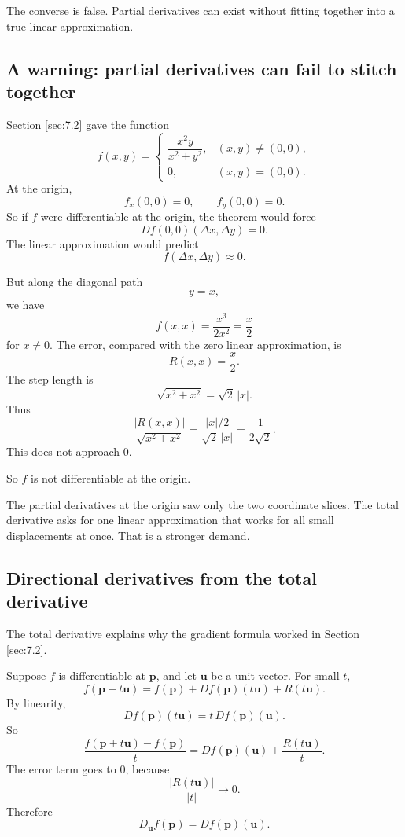 The converse is false.  Partial derivatives can exist without fitting together into a true
linear approximation.

\subsection{A warning: partial derivatives can fail to stitch together}

Section \ref{sec:7.2} gave the function
\[
    f(x,y)=
    \begin{cases}
    \dfrac{x^2y}{x^2+y^2}, & (x,y)\ne(0,0),\\[2mm]
    0, & (x,y)=(0,0).
    \end{cases}
\]
At the origin,
\[
    f_x(0,0)=0,
    \qquad
    f_y(0,0)=0.
\]
So if \(f\) were differentiable at the origin, the theorem would force
\[
    Df(0,0)(\Delta x,\Delta y)=0.
\]
The linear approximation would predict
\[
    f(\Delta x,\Delta y)\approx 0.
\]

But along the diagonal path
\[
    y=x,
\]
we have
\[
    f(x,x)=\frac{x^3}{2x^2}=\frac{x}{2}
\]
for \(x\ne0\).  The error, compared with the zero linear approximation, is
\[
    R(x,x)=\frac{x}{2}.
\]
The step length is
\[
    \sqrt{x^2+x^2}=\sqrt2\,|x|.
\]
Thus
\[
    \frac{|R(x,x)|}{\sqrt{x^2+x^2}}
    =
    \frac{|x|/2}{\sqrt2\,|x|}
    =
    \frac{1}{2\sqrt2}.
\]
This does not approach \(0\).

So \(f\) is not differentiable at the origin.

The partial derivatives at the origin saw only the two coordinate slices.  The total
derivative asks for one linear approximation that works for all small displacements at
once.  That is a stronger demand.

\subsection{Directional derivatives from the total derivative}

The total derivative explains why the gradient formula worked in Section
\ref{sec:7.2}.

Suppose \(f\) is differentiable at \(\mathbf p\), and let \(\mathbf u\) be a unit vector.
For small \(t\),
\[
    f(\mathbf p+t\mathbf u)
    =
    f(\mathbf p)+Df(\mathbf p)(t\mathbf u)+R(t\mathbf u).
\]
By linearity,
\[
    Df(\mathbf p)(t\mathbf u)=t\,Df(\mathbf p)(\mathbf u).
\]
So
\[
    \frac{f(\mathbf p+t\mathbf u)-f(\mathbf p)}{t}
    =
    Df(\mathbf p)(\mathbf u)+\frac{R(t\mathbf u)}{t}.
\]
The error term goes to \(0\), because
\[
    \frac{|R(t\mathbf u)|}{|t|}\to0.
\]
Therefore
\[
\boxed{
    D_{\mathbf u}f(\mathbf p)=Df(\mathbf p)(\mathbf u).
}
\]

